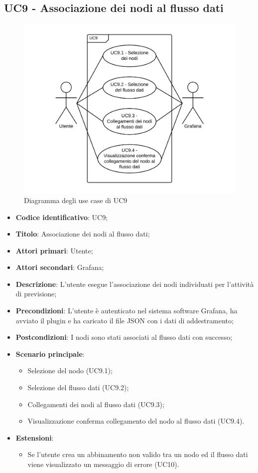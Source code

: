 \subsection{UC9 - Associazione dei nodi al flusso dati}
\begin{figure}[H]
\includegraphics{img/UC9_-_Associazione_dei_nodi_al_flusso_dati.png}
\caption{Diagramma degli use case di UC9}
\end{figure}
\begin{itemize}
	\item \textbf{Codice identificativo}: UC9;
	\item \textbf{Titolo}: Associazione dei nodi al flusso dati;
	\item \textbf{Attori primari}: Utente;
	\item \textbf{Attori secondari}: Grafana\glo;
	\item \textbf{Descrizione}: L'utente esegue l'associazione dei nodi individuati per l'attività di previsione;
	\item \textbf{Precondizioni}: L'utente è autenticato nel sistema software Grafana\glosp, ha avviato il plugin e ha caricato il file JSON con i dati di addestramento;
	\item \textbf{Postcondizioni}: I nodi sono stati associati al flusso dati con successo;
	\item \textbf{Scenario principale}: 
		\begin{itemize}
			\item Selezione del nodo (UC9.1);
			\item Selezione del flusso dati (UC9.2);
			\item Collegamenti dei nodi al flusso dati (UC9.3);
			\item Visualizzazione conferma collegamento del nodo al flusso dati (UC9.4).
		\end{itemize}
	\item \textbf{Estensioni}:
		\begin{itemize}
			\item Se l'utente crea un abbinamento non valido tra un nodo ed il flusso dati viene visualizzato un messaggio di errore (UC10).
		\end{itemize}
\end{itemize}

